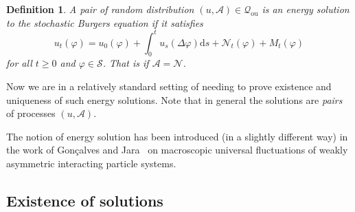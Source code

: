 \documentclass[a4paper,11pt]{article}
\newcommand{\mathd}{\mathrm{d}}
\newcommand{\tmem}[1]{{\em #1\/}}
\newcommand{\tmop}[1]{\ensuremath{\operatorname{#1}}}
\newtheorem{definition}{Definition}
{\theorembodyfont{\rmfamily}\newtheorem{example}{Example}}
{\theorembodyfont{\rmfamily\small\it}\newtheorem{exercise}{Exercise}}
\newcommand{\CS}{\mathscr{S}}
\begin{document}
\begin{definition}
  A pair of random distribution $(u, \mathcal{A}) \in \mathcal{Q}_{\tmop{ou}}$
  is an {\tmem{energy solution}} to the stochastic Burgers equation if it
  satisfies
  \[ u_t (\varphi) = u_0 (\varphi) + \int_0^t u_s (\Delta \varphi) \mathd s
     +\mathcal{N}_t (\varphi) + M_t (\varphi) \]
  for all $t \geqslant 0$ and $\varphi \in \CS$. That is if
  $\mathcal{A}=\mathcal{N}$. 
\end{definition}

Now we are in a relatively standard setting of needing to prove existence and
uniqueness of such energy solutions. Note that in general the solutions are
{\tmem{pairs}} of processes $(u, \mathcal{A})$.

\begin{remark}
  The notion of energy solution has been introduced (in a slightly different
  way) in the work of Gon{\c c}alves and
  Jara~{\cite{goncalves_universality_2010}} on macroscopic universal
  fluctuations of weakly asymmetric interacting particle systems.
\end{remark}

\subsection{Existence of solutions}
\end{document}
